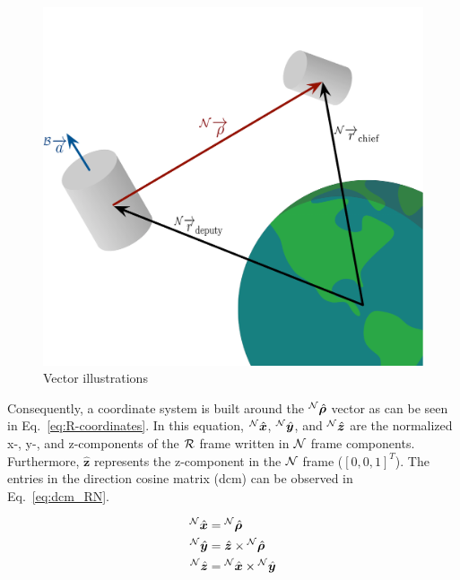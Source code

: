 \begin{figure}[htb]
	\centerline{
	\includegraphics[scale=0.52]{Figures/relativePointing.pdf}
	}
	\caption{Vector illustrations}
	\label{fig:rel_point}
\end{figure}

Consequently, a coordinate system is built around the $^{\cal N}\hat{{\bm \rho}}$ vector as can be seen in Eq.~\eqref{eq:R-coordinates}. In this equation, ${^{\cal N}\hat{{\bm x}}}$, ${^{\cal N}\hat{{\bm y}}}$, and ${^{\cal N}\hat{{\bm z}}}$ are the normalized x-, y-, and z-components of the $\cal R$ frame written in $\cal N$ frame components. Furthermore, ${\hat{\bm z}}$ represents the z-component in the $\cal N$ frame ($[0,0,1]^{T}$). The entries in the direction cosine matrix (dcm) can be observed in Eq.~\eqref{eq:dcm_RN}. 

\begin{equation}
    \begin{split}
    {^{\cal N}\hat{{\bm x}}} &= {^{\cal N}\hat{{\bm \rho}}} \\
    {^{\cal N}\hat{{\bm y}}} &= {\hat{\bm z}} \times {^{\cal N}\hat{{\bm \rho}}} \\
    {^{\cal N}\hat{{\bm z}}} &= {^{\cal N}\hat{{\bm x}}} \times {^{\cal N}\hat{{\bm y}}}
    \end{split}
    \label{eq:R-coordinates}
\end{equation}

